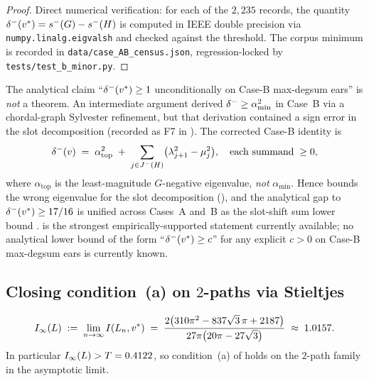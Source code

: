 \begin{proof}
Direct numerical verification: for each of the $2{,}235$ records, the
quantity $\delta^{-}(v^{*}) = s^{-}(G) - s^{-}(H)$ is
computed in IEEE double precision via \texttt{numpy.linalg.eigvalsh} and
checked against the threshold. The corpus minimum is recorded in
\texttt{data/case\_AB\_census.json}, regression-locked by
\texttt{tests/test\_b\_minor.py}.
\end{proof}

\begin{remark}\label{rem:bminor-gap}
The analytical claim ``$\delta^{-}(v^{*}) \ge 1$ unconditionally on
Case-B max-degsum ears'' is \emph{not} a theorem. An intermediate
argument derived $\delta^{-} \ge \alpha_{\min}^{2}$ in Case~B via a
chordal-graph Sylvester refinement, but that derivation contained a
sign error in the slot decomposition (recorded as F7 in
). The corrected Case-B identity is
\[
\delta^{-}(v) \;=\; \alpha_{\text{top}}^{2} \;+\;
\sum_{j \in J^{-}(H)} \bigl(\lambda_{j+1}^{2} - \mu_{j}^{2}\bigr),
\quad \text{each summand}\; \ge 0,
\]
where $\alpha_{\text{top}}$ is the least-magnitude $G$-negative
eigenvalue, \emph{not} $\alpha_{\min}$. Hence 
bounds the wrong eigenvalue for the slot decomposition
(), and the analytical gap to
$\delta^{-}(v^{*}) \ge 17/16$ is unified across Cases~A and~B as the
slot-shift sum lower bound .
 is the strongest empirically-supported
statement currently available; no analytical lower bound of the form
``$\delta^{-}(v^{*}) \ge c$'' for any explicit $c > 0$ on Case-B
max-degsum ears is currently known.
\end{remark}

\subsection{Closing condition~(a) on $2$-paths via Stieltjes}
\label{sec:moment-form:stieltjes}

\begin{theorem}\label{thm:moment-form-stieltjes}
\[
I_{\infty}(L) \;:=\; \lim_{n \to \infty} I(L_{n}, v^{*})
\;=\; \frac{2\bigl(310 \pi^{2} - 837 \sqrt{3}\, \pi + 2187\bigr)}
        {27 \pi \bigl(20 \pi - 27 \sqrt{3}\bigr)}
\;\approx\; 1.0157.
\]
In particular $I_{\infty}(L) > T = 0.4122$, so condition~(a) of
 holds on the $2$-path family in the
asymptotic limit.
\end{theorem}

